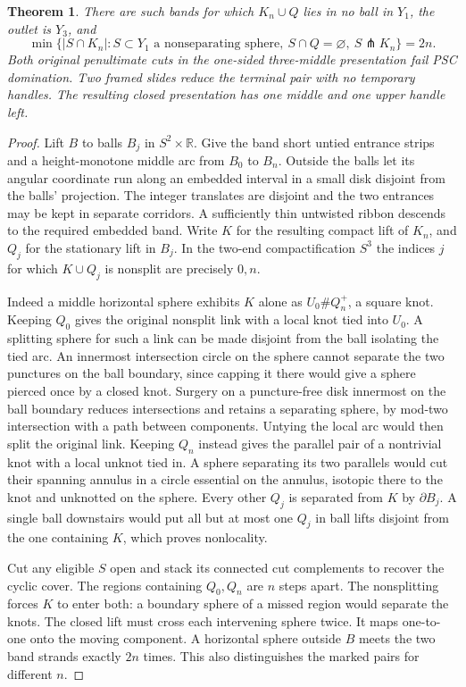 \documentclass[11pt,letterpaper]{article}
\numberwithin{equation}{section}
\newtheorem{theorem}{Theorem}[section]
\theoremstyle{remark}
\begin{document}
\begin{theorem}\label{thm:nonlocal}
There are such bands for which \(K_n\cup Q\) lies in no ball in
\(Y_1\), the outlet is \(Y_3\), and
\[
 \min\{|S\cap K_n|:S\subset Y_1\text{ a nonseparating sphere},
             \ S\cap Q=\varnothing,\ S\pitchfork K_n\}=2n .
\]
Both original penultimate cuts in the one-sided three-middle
presentation fail PSC domination. Two framed slides reduce the
terminal pair with no temporary handles. The resulting closed
presentation has one middle and one upper handle left.
\end{theorem}
\begin{proof}
Lift \(B\) to balls \(B_j\) in \(S^2\times\mathbb R\). Give the
band short untied entrance strips and a height-monotone middle arc
from \(B_0\) to \(B_n\). Outside the balls let its angular coordinate
run along an embedded interval in a small disk disjoint from the
balls' projection. The integer translates are disjoint and the
two entrances may be kept in separate corridors. A sufficiently
thin untwisted ribbon descends to the required embedded band.
Write \(K\) for the resulting compact lift of \(K_n\), and \(Q_j\)
for the stationary lift in \(B_j\). In the two-end compactification
\(S^3\) the indices \(j\) for which \(K\cup Q_j\) is nonsplit are
precisely \(0,n\).

Indeed a middle horizontal sphere exhibits \(K\) alone as
\(U_0\#Q_n^+\), a square knot. Keeping \(Q_0\) gives the original
nonsplit link with a local knot tied into \(U_0\). A splitting sphere
for such a link can be made disjoint from the ball isolating the
tied arc. An innermost intersection circle on the sphere cannot
separate the two punctures on the ball boundary, since capping it
there would give a sphere pierced once by a closed knot. Surgery
on a puncture-free disk innermost on the ball boundary reduces
intersections and retains a separating sphere, by mod-two
intersection with a path between components. Untying the local arc
would then split the original link. Keeping \(Q_n\) instead gives
the parallel pair of a nontrivial knot with a local unknot tied in.
A sphere separating its two parallels would cut their spanning
annulus in a circle essential on the annulus, isotopic there to the
knot and unknotted on the sphere. Every other \(Q_j\) is separated
from \(K\) by \(\partial B_j\). A single ball downstairs would put
all but at most one \(Q_j\) in ball lifts disjoint from the one
containing \(K\), which proves nonlocality.

Cut any eligible \(S\) open and stack its connected cut complements
to recover the cyclic cover. The regions containing \(Q_0,Q_n\)
are \(n\) steps apart. The nonsplitting forces \(K\) to enter both:
a boundary sphere of a missed region would separate the knots.
The closed lift must cross each intervening sphere twice. It maps
one-to-one onto the moving component. A horizontal sphere outside
\(B\) meets the two band strands exactly \(2n\) times. This also
distinguishes the marked pairs for different \(n\).


\end{proof}
\end{document}

